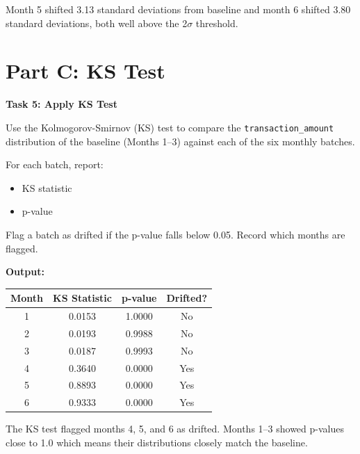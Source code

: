 \documentclass[12pt,a4paper]{article}
\begin{document}
\vspace{4pt}
Month 5 shifted 3.13 standard deviations from baseline and month 6 shifted 3.80 standard deviations, both well above the 2$\sigma$ threshold.

\vspace{24pt}


\section*{Part C: KS Test}

\begin{tcolorbox}
\textbf{Task 5: Apply KS Test}

Use the Kolmogorov-Smirnov (KS) test to compare the \texttt{transaction\_amount} distribution of the baseline (Months 1--3) against each of the six monthly batches.

For each batch, report:
\begin{itemize}
\item KS statistic
\item p-value
\end{itemize}

Flag a batch as drifted if the p-value falls below 0.05. Record which months are flagged.
\end{tcolorbox}

\vspace{6pt}

\textbf{Output:}

\begin{center}
\renewcommand{\arraystretch}{1.4}
\begin{tabular}{cccc}
\toprule
\textbf{Month} & \textbf{KS Statistic} & \textbf{p-value} & \textbf{Drifted?} \\
\midrule
1 & 0.0153 & 1.0000 & No \\
2 & 0.0193 & 0.9988 & No \\
3 & 0.0187 & 0.9993 & No \\
4 & 0.3640 & 0.0000 & Yes \\
5 & 0.8893 & 0.0000 & Yes \\
6 & 0.9333 & 0.0000 & Yes \\
\bottomrule
\end{tabular}
\renewcommand{\arraystretch}{1.0}
\end{center}

\vspace{4pt}
The KS test flagged months 4, 5, and 6 as drifted. Months 1--3 showed p-values close to 1.0 which means their distributions closely match the baseline.
\end{document}
